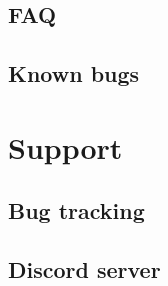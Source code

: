 \documentclass[12pt]{article}
\begin{document}
\subsection{FAQ}
\subsection{Known bugs}


\section{Support}
\subsection{Bug tracking}
\subsection{Discord server}
\end{document}
